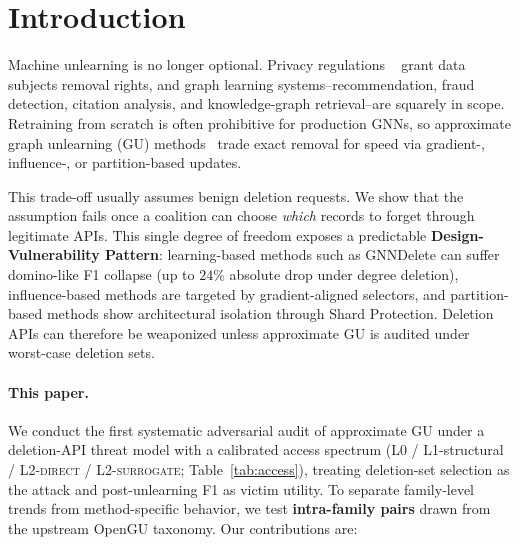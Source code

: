\section{Introduction}
\label{sec:intro}

Machine unlearning is no longer optional. Privacy regulations
~\cite{gdpr2016,ccpa2018} grant data subjects removal rights, and graph
learning systems--recommendation, fraud detection, citation analysis, and
knowledge-graph retrieval--are squarely in scope. Retraining from scratch
is often prohibitive for production GNNs, so approximate graph unlearning
(GU) methods~\cite{chen2022graph,wu2023gif,cheng2023gnndelete,li2024towards,dong2024idea,zhang2024towards}
trade exact removal for speed via gradient-, influence-, or
partition-based updates.

This trade-off usually assumes benign deletion requests. We show that
the assumption fails once a coalition can choose \emph{which} records to
forget through legitimate APIs. This single degree of freedom exposes a
predictable \textbf{Design-Vulnerability Pattern}: learning-based methods
such as GNNDelete can suffer domino-like F1 collapse (up to $24\%$
absolute drop under degree deletion), influence-based methods are
targeted by gradient-aligned selectors, and partition-based methods show
architectural isolation through Shard Protection. Deletion APIs can
therefore be weaponized unless approximate GU is audited under
worst-case deletion sets.

\paragraph{This paper.}
We conduct the first systematic adversarial audit of approximate GU
under a deletion-API threat model with a calibrated access spectrum
(L0 / L1-structural / L2-\textsc{direct} / L2-\textsc{surrogate};
Table~\ref{tab:access}), treating deletion-set selection as the attack
and post-unlearning F1 as victim utility. To separate family-level trends
from method-specific behavior, we test \textbf{intra-family pairs} drawn
from the upstream OpenGU taxonomy. Our contributions are:


